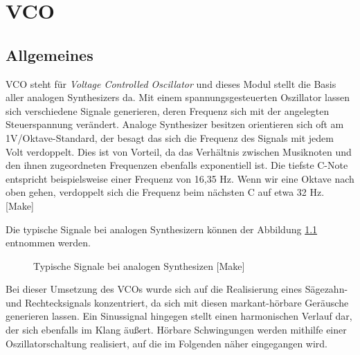\chapter{VCO}
\label{ch:VCO}
\section{Allgemeines}

VCO steht für \textit{Voltage Controlled Oscillator} und dieses Modul stellt die Basis aller analogen Synthesizers da. 
Mit einem spannungsgesteuerten Oszillator lassen sich verschiedene Signale generieren, deren Frequenz sich mit der angelegten Steuerspannung verändert.
Analoge Synthesizer besitzen orientieren sich oft am 1V/Oktave-Standard, der besagt das sich die Frequenz des Signals mit jedem Volt verdoppelt.
Dies ist von Vorteil, da das Verhältnis zwischen Musiknoten und den ihnen zugeordneten Frequenzen ebenfalls exponentiell ist.
Die tiefste C-Note entspricht beispielsweise einer Frequenz von 16,35 Hz.
Wenn wir eine Oktave nach oben gehen, verdoppelt sich die Frequenz beim nächsten C auf etwa 32 Hz. [Make]

Die typische Signale bei analogen Synthesizern können der Abbildung \ref{fig:Waveforms} entnommen werden.

\begin{figure}[h]
	\centering
	\setlength{\fboxsep}{1pt} %
	\setlength{\fboxrule}{1pt} %
	\caption{Typische Signale bei analogen Synthesizen [Make]}
	\label{fig:Waveforms}
\end{figure}

Bei dieser Umsetzung des VCOs wurde sich auf die Realisierung eines Sägezahn- und Rechtecksignals konzentriert, da sich mit diesen markant-hörbare Geräusche generieren lassen.
Ein Sinussignal hingegen stellt einen harmonischen Verlauf dar, der sich ebenfalls im Klang äußert.
Hörbare Schwingungen werden mithilfe einer Oszillatorschaltung realisiert, auf die im Folgenden näher eingegangen wird.

